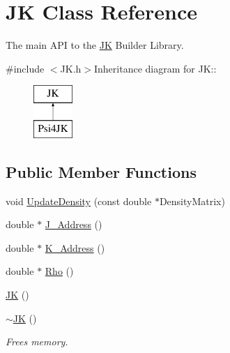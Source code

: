 \hypertarget{classJKBuilder_1_1JK}{
\section{JK Class Reference}
\label{classJKBuilder_1_1JK}
}


The main API to the \hyperlink{classJKBuilder_1_1JK}{JK} Builder Library.  


{\ttfamily \#include $<$JK.h$>$}Inheritance diagram for JK::\begin{figure}[H]
\begin{center}
\leavevmode
\includegraphics[height=2cm]{classJKBuilder_1_1JK}
\end{center}
\end{figure}
\subsection*{Public Member Functions}
\begin{DoxyCompactItemize}
\item 
void \hyperlink{classJKBuilder_1_1JK_ac0b62715458b98f8426017fdd8864670}{UpdateDensity} (const double $\ast$DensityMatrix)
\item 
double $\ast$ \hyperlink{classJKBuilder_1_1JK_ada0787d51feb1496d4aa3a786f870f88}{J\_\-Address} ()
\item 
double $\ast$ \hyperlink{classJKBuilder_1_1JK_a198d3c4da107eb0d9cfafa795f8d635b}{K\_\-Address} ()
\item 
double $\ast$ \hyperlink{classJKBuilder_1_1JK_a5104eb472d984f59df6ca3b91c625209}{Rho} ()
\item 
\hyperlink{classJKBuilder_1_1JK_ab667fd0f6ae1fdbf02a7aed8eb4cd4a8}{JK} ()
\item 
\hyperlink{classJKBuilder_1_1JK_a80533e1759361da2e871e53ba64161af}{$\sim$JK} ()
\begin{DoxyCompactList}\small\item\em Frees memory. \item\end{DoxyCompactList}\end{DoxyCompactItemize}
